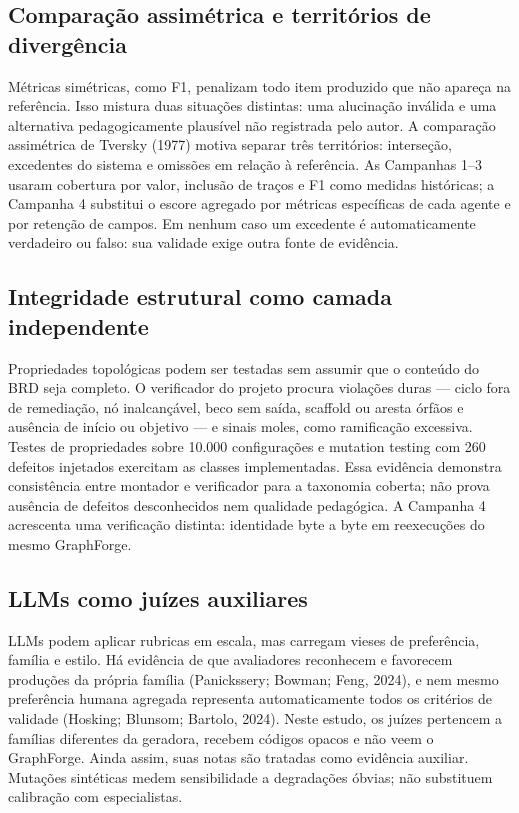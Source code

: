 \documentclass[11pt,a4paper]{article}
\begin{document}
\subsection{Comparação assimétrica e territórios de divergência}

Métricas simétricas, como F1, penalizam todo item produzido que não apareça na referência. Isso mistura duas situações distintas: uma alucinação inválida e uma alternativa pedagogicamente plausível não registrada pelo autor. A comparação assimétrica de Tversky (1977) motiva separar três territórios: interseção, excedentes do sistema e omissões em relação à referência. As Campanhas 1--3 usaram cobertura por valor, inclusão de traços e F1 como medidas históricas; a Campanha 4 substitui o escore agregado por métricas específicas de cada agente e por retenção de campos. Em nenhum caso um excedente é automaticamente verdadeiro ou falso: sua validade exige outra fonte de evidência.

\subsection{Integridade estrutural como camada independente}

Propriedades topológicas podem ser testadas sem assumir que o conteúdo do BRD seja completo. O verificador do projeto procura violações duras --- ciclo fora de remediação, nó inalcançável, beco sem saída, scaffold ou aresta órfãos e ausência de início ou objetivo --- e sinais moles, como ramificação excessiva. Testes de propriedades sobre 10.000 configurações e mutation testing com 260 defeitos injetados exercitam as classes implementadas. Essa evidência demonstra consistência entre montador e verificador para a taxonomia coberta; não prova ausência de defeitos desconhecidos nem qualidade pedagógica. A Campanha 4 acrescenta uma verificação distinta: identidade byte a byte em reexecuções do mesmo GraphForge.

\subsection{LLMs como juízes auxiliares}

LLMs podem aplicar rubricas em escala, mas carregam vieses de preferência, família e estilo. Há evidência de que avaliadores reconhecem e favorecem produções da própria família (Panickssery; Bowman; Feng, 2024), e nem mesmo preferência humana agregada representa automaticamente todos os critérios de validade (Hosking; Blunsom; Bartolo, 2024). Neste estudo, os juízes pertencem a famílias diferentes da geradora, recebem códigos opacos e não veem o GraphForge. Ainda assim, suas notas são tratadas como evidência auxiliar. Mutações sintéticas medem sensibilidade a degradações óbvias; não substituem calibração com especialistas.
\end{document}
